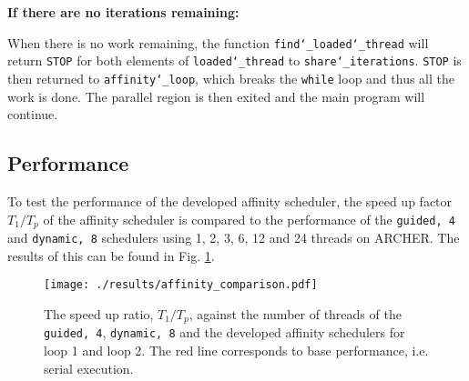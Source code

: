 \documentclass[11pt, a4paper]{article}
\begin{document}
				\noindent \textbf{If there are no iterations remaining:}
			
				When there is no work remaining, the function \texttt{find\char`_loaded\char`_thread} will return \texttt{STOP} for both elements of \texttt{loaded\char`_thread} to \texttt{share\char`_iterations}. \texttt{STOP} is then returned to \texttt{affinity\char`_loop}, which breaks the \texttt{while} loop and thus all the work is done. The parallel region is then exited and the main program will continue.
				
		
		\subsection{Performance}
			To test the performance of the developed affinity scheduler, the speed up factor $T_{1}/T_{p}$ of the affinity scheduler is compared to the performance of the \texttt{guided, 4} and \texttt{dynamic, 8} schedulers using 1, 2, 3, 6, 12 and 24 threads on ARCHER. The results of this can be found in Fig. \ref{fig:affinity_comparison}.
			
			\begin{figure}
				\centering
				\texttt{[image: ./results/affinity\_comparison.pdf]}
				\caption{The speed up ratio, $T_{1}/T_{p}$, against the number of threads of the \texttt{guided, 4},  \texttt{dynamic, 8} and the developed affinity schedulers for loop 1 and loop 2. The red line corresponds to base performance, i.e. serial execution.}
				\label{fig:affinity_comparison}
			\end{figure}
		
\end{document}
